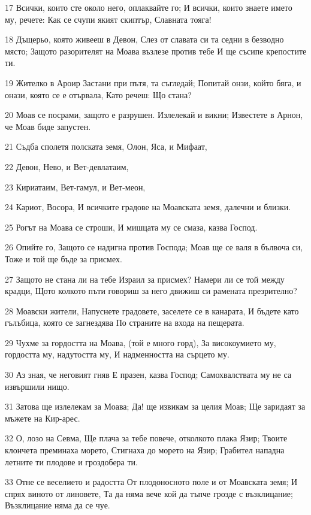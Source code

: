 \par 17 Всички, които сте около него, оплаквайте го; И всички, които знаете името му, речете: Как се счупи якият скиптър, Славната тояга!
\par 18 Дъщерьо, която живееш в Девон, Слез от славата си та седни в безводно място; Защото разорителят на Моава възлезе против тебе И ще съсипе крепостите ти.
\par 19 Жителко в Ароир Застани при пътя, та съгледай; Попитай онзи, който бяга, и онази, която се е отървала, Като речеш: Що стана?
\par 20 Моав се посрами, защото е разрушен. Излелекай и викни; Известете в Арнон, че Моав биде запустен.
\par 21 Съдба сполетя полската земя, Олон, Яса, и Мифаат,
\par 22 Девон, Нево, и Вет-девлатаим,
\par 23 Кириатаим, Вет-гамул, и Вет-меон,
\par 24 Кариот, Восора, И всичките градове на Моавската земя, далечни и близки.
\par 25 Рогът на Моава се строши, И мишцата му се смаза, казва Господ.
\par 26 Опийте го, Защото се надигна против Господа; Моав ще се валя в бълвоча си, Тоже и той ще бъде за присмех.
\par 27 Защото не стана ли на тебе Израил за присмех? Намери ли се той между крадци, Щото колкото пъти говориш за него движиш си рамената презрително?
\par 28 Моавски жители, Напуснете градовете, заселете се в канарата, И бъдете като гълъбица, която се загнездява По страните на входа на пещерата.
\par 29 Чухме за гордостта на Моава, (той е много горд), За високоумието му, гордостта му, надутостта му, И надменността на сърцето му.
\par 30 Аз зная, че неговият гняв Е празен, казва Господ; Самохвалствата му не са извършили нищо.
\par 31 Затова ще излелекам за Моава; Да! ще извикам за целия Моав; Ще заридаят за мъжете на Кир-арес.
\par 32 О, лозо на Севма, Ще плача за тебе повече, отколкото плака Язир; Твоите клончета преминаха морето, Стигнаха до морето на Язир; Грабител нападна летните ти плодове и гроздобера ти.
\par 33 Отне се веселието и радостта От плодоносното поле и от Моавската земя; И спрях виното от линовете, Та да няма вече кой да тъпче грозде с възклицание; Възклицание няма да се чуе.
